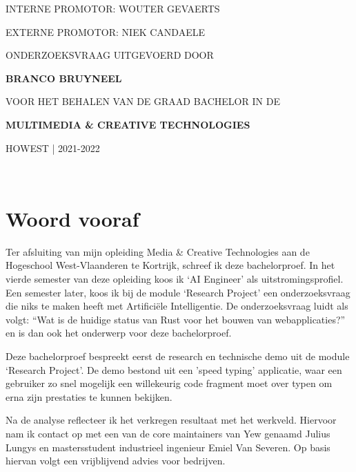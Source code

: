 \documentclass[11pt,a4paper,oneside]{book}
\begin{document}
\begin{titlepage}
\begin{adjustwidth}{1.5cm}{1.5cm}
    \MakeUppercase{interne promotor: Wouter Gevaerts}

    \MakeUppercase{externe promotor: Niek Candaele}

    \vspace{1em}

    \MakeUppercase{\small{onderzoeksvraag uitgevoerd door}}

    \MakeUppercase{\Large\textbf{{Branco Bruyneel}}}

    \MakeUppercase{\small{voor het behalen van de graad bachelor in de}}

    \MakeUppercase{\Large{\textbf{{Multimedia \& Creative Technologies}}}}

    \MakeUppercase{Howest | 2021-2022}
    \end{adjustwidth}
\end{titlepage}



\clearpage

\thispagestyle{empty}
\ %

\clearpage


\chapter*{Woord vooraf}
Ter afsluiting van mijn opleiding Media \& Creative Technologies aan de Hogeschool West-Vlaanderen
te Kortrijk, schreef ik deze bachelorproef.  In het vierde semester van deze opleiding koos ik ‘AI
Engineer’ als uitstromingsprofiel. Een semester later, koos ik bij de module ‘Research Project’ een
onderzoeksvraag die niks te maken heeft met Artificiële Intelligentie. De onderzoeksvraag luidt als
volgt: \enquote{Wat is de huidige status van Rust voor het bouwen van webapplicaties?} en is dan ook
het onderwerp voor deze bachelorproef. 

Deze bachelorproef bespreekt eerst de research en technische demo uit de module ‘Research Project’.
De demo bestond uit een 'speed typing' applicatie, waar een gebruiker zo snel mogelijk een
willekeurig code fragment moet over typen om erna zijn prestaties te kunnen bekijken. 

Na de analyse reflecteer ik het verkregen resultaat met het werkveld. Hiervoor nam ik contact op met
een van de core maintainers van Yew genaamd Julius Lungys en mastersstudent industrieel ingenieur
Emiel Van Severen. Op basis hiervan volgt een vrijblijvend advies voor bedrijven. 
\end{document}
